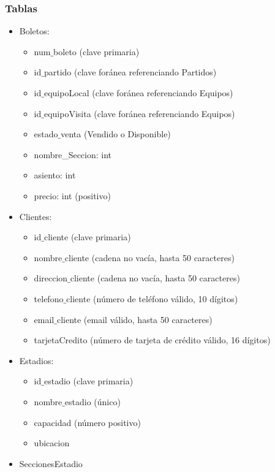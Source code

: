 \subsubsection*{Tablas}

\begin{itemize}
    \item Boletos:
    \begin{itemize} 
        \item num$\_$boleto (clave primaria)
        \item id$\_$partido (clave foránea referenciando Partidos)
        \item id$\_$equipoLocal (clave foránea referenciando Equipos)
        \item id$\_$equipoVisita (clave foránea referenciando Equipos)
        \item estado$\_$venta (Vendido o Disponible)
        \item nombre_Seccion: int
        \item asiento: int
        \item precio: int (positivo)
    \end{itemize}
    \item Clientes:
    \begin{itemize}
        \item id$\_$cliente (clave primaria)
        \item nombre$\_$cliente (cadena no vacía, hasta 50 caracteres)
        \item direccion$\_$cliente (cadena no vacía, hasta 50 caracteres)
        \item telefono$\_$cliente (número de teléfono válido, 10 dígitos)
        \item email$\_$cliente (email válido, hasta 50 caracteres)
        \item tarjetaCredito (número de tarjeta de crédito válido, 16 dígitos)
    \end{itemize}
    \item Estadios:
    \begin{itemize}
        \item id$\_$estadio (clave primaria)
        \item nombre$\_$estadio (único)
        \item capacidad (número positivo)
        \item ubicacion
    \end{itemize}
    \item SeccionesEstadio
    \begin{itemize}

\end{itemize}
\end{itemize}
